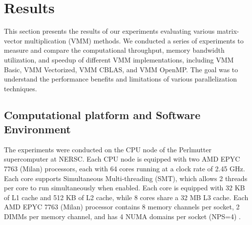 \section{Results}

This section presents the results of our experiments evaluating various matrix-vector multiplication (VMM) methods. We conducted a series of experiments to measure and compare the computational throughput, memory bandwidth utilization, and speedup of different VMM implementations, including VMM Basic, VMM Vectorized, VMM CBLAS, and VMM OpenMP. The goal was to understand the performance benefits and limitations of various parallelization techniques.

\subsection{Computational platform and Software Environment}
\label{sec:computational-platform-and-software-environment}

The experiments were conducted on the CPU node of the Perlmutter supercomputer at NERSC. Each CPU node is equipped with two AMD EPYC 7763 (Milan) processors, each with 64 cores running at a clock rate of 2.45 GHz. Each core supports Simultaneous Multi-threading (SMT), which allows 2 threads per core to run simultaneously when enabled. Each core is equipped with 32 KB of L1 cache and 512 KB of L2 cache, while 8 cores share a 32 MB L3 cache. Each AMD EPYC 7763 (Milan) processor contains 8 memory channels per socket, 2 DIMMs per memory channel, and has 4 NUMA domains per socket (NPS=4) \cite{amd_epyc_tuning_guide}.

